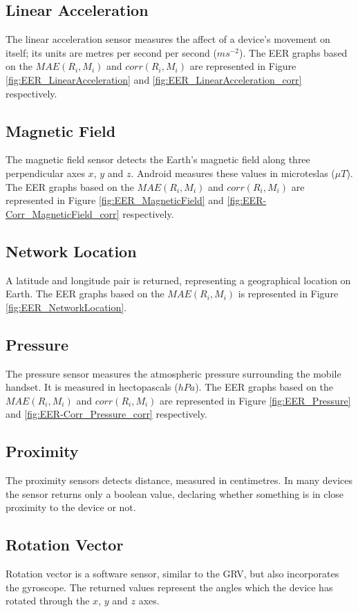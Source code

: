 \documentclass{article}
\begin{document}
\subsection{Linear Acceleration}
The linear acceleration sensor measures the affect of a device's movement on itself; its units are metres per second per second ($ms^{-2}$). The EER graphs based on the $MAE(R_i, M_i)$ and $corr(R_i, M_i)$ are represented in Figure \ref{fig:EER_LinearAcceleration} and \ref{fig:EER_LinearAcceleration_corr} respectively.

\subsection{Magnetic Field}
The magnetic field sensor detects the Earth's magnetic field along three perpendicular axes $x$, $y$ and $z$.  Android measures these values in microteslas ($\mu T$).  The EER graphs based on the $MAE(R_i, M_i)$ and $corr(R_i, M_i)$ are represented in Figure \ref{fig:EER_MagneticField} and \ref{fig:EER-Corr_MagneticField_corr} respectively.  

\subsection{Network Location}
A latitude and longitude pair is returned, representing a geographical location on Earth.  The EER graphs based on the $MAE(R_i, M_i)$ is represented in Figure \ref{fig:EER_NetworkLocation}.

\subsection{Pressure}
The pressure sensor measures the atmospheric pressure surrounding the mobile handset. It is measured in hectopascals ($hPa$).
The EER graphs based on the $MAE(R_i, M_i)$ and $corr(R_i, M_i)$ are represented in Figure \ref{fig:EER_Pressure} and \ref{fig:EER-Corr_Pressure_corr} respectively.

\subsection{Proximity}
The proximity sensors detects distance, measured in centimetres.
In many devices the sensor returns only a boolean value, declaring whether something is in close proximity to the device or not.


\subsection{Rotation Vector}
Rotation vector is a software sensor, similar to the GRV, but also incorporates the gyroscope. The returned values represent the angles which the device has rotated through the $x$, $y$ and $z$ axes.
\end{document}
